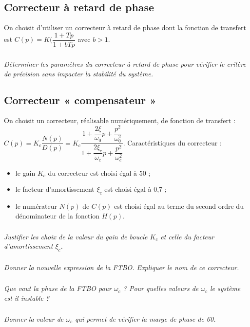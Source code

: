 \documentclass[10pt,fleqn]{article} %
\begin{document}
\begin{multicols}{2}
\subsection*{Correcteur à retard de phase}
On choisit d’utiliser un correcteur à retard de phase dont la fonction de transfert est $C(p)=K (\dfrac{1+Tp}{1+bTp}$ avec $b>1$.
\subparagraph{}
\textit{Déterminer les paramètres du correcteur à retard de phase pour vérifier le critère de précision sans impacter la stabilité du système.}
\ifprof
\begin{corrige}
\end{corrige}
\else
\fi


\subsection*{Correcteur « compensateur »}
On choisit un correcteur, réalisable numériquement, de fonction de transfert :	$C(p)=K_c\dfrac{ N(p)}{D(p)}=K_c\dfrac{1+\dfrac{2\xi}{\omega_0} p+\dfrac{p^2}{\omega_0^2}}{1+\dfrac{2\xi_c}{\omega_c}  p+\dfrac{p^2}{\omega_c^2 }}$.
Caractéristiques du correcteur :	
\begin{itemize}
\item le gain $K_c$ du correcteur est choisi égal à 50 ;
\item le facteur d’amortissement $\xi_c$ est choisi égal à 0,7 ;
\item le numérateur $N(p)$ de $C(p)$ est choisi égal au terme du second ordre du dénominateur de la fonction $H(p)$.
\end{itemize}
\subparagraph{}
\textit{Justifier les choix de la valeur du gain de boucle $K_c$ et celle du facteur d’amortissement $\xi_c$.}
\ifprof
\begin{corrige}
\end{corrige}
\else
\fi

\subparagraph{}
\textit{Donner la nouvelle expression de la FTBO. Expliquer le nom de ce correcteur.}
\ifprof
\begin{corrige}
\end{corrige}
\else
\fi

\subparagraph{}
\textit{Que vaut la phase de la FTBO pour $\omega_c$ ? Pour quelles valeurs de $\omega_c$  le système est-il instable ?}
\ifprof
\begin{corrige}
\end{corrige}
\else
\fi

\subparagraph{}
\textit{Donner la valeur de $\omega_c$  qui permet de vérifier la marge de phase de 60\degres.}
\ifprof
\begin{corrige}
\end{corrige}
\else
\fi


\end{multicols}
\end{document}
